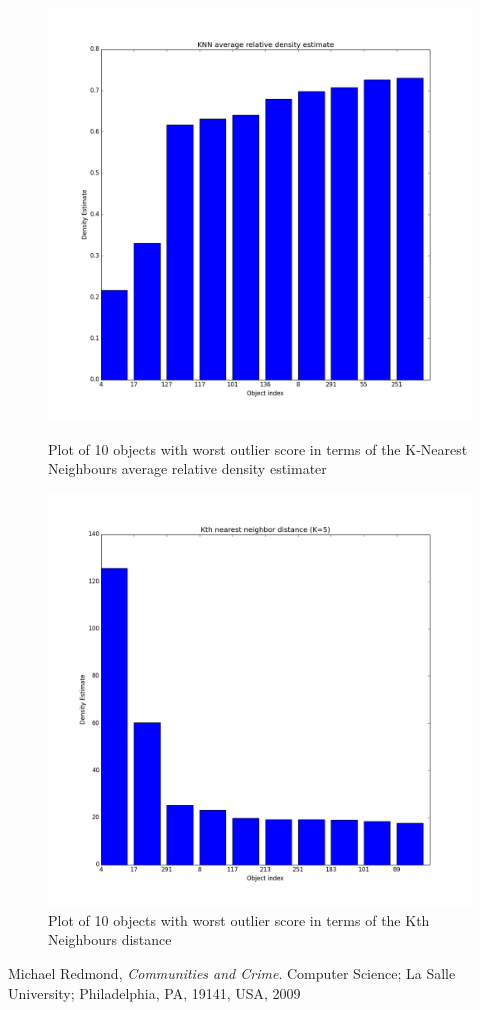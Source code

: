 \documentclass[a4paper,10pt]{article}
\begin{document}
\begin{figure}[H]
\centering
\begin{minipage}{.45\textwidth}
  \centering
  \includegraphics[width=0.9\linewidth]{fig_anomaly_knn_avgrel_de}
  \caption{Plot of 10 objects with worst outlier score in terms of the K-Nearest Neighbours average relative density estimater}
  \label{fig_anom_knn_avgrel}
\end{minipage}\hfill
\begin{minipage}{.45\textwidth}
  \centering
  \includegraphics[width=0.9\linewidth]{fig_anomaly_knndist}
  \caption{Plot of 10 objects with worst outlier score in terms of the Kth Neighbours distance}
  \label{fig_anom_kndist}
\end{minipage}
\end{figure}


\begin{thebibliography}{9}

  Michael Redmond,
  \emph{Communities and Crime}.
  Computer Science; La Salle University; Philadelphia, PA, 19141, USA,
  2009

\end{thebibliography}
\end{document}
